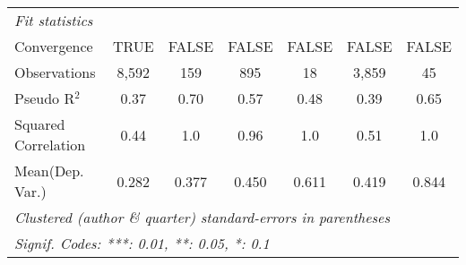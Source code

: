 \begin{tabular}{lcccccc}
   \midrule
   \emph{Fit statistics}\\
   Convergence                                                &TRUE         & FALSE        & FALSE         & FALSE & FALSE         & FALSE\\  
   Observations                                               & 8,592       & 159          & 895           & 18    & 3,859         & 45\\  
   Pseudo R$^2$                                               & 0.37        & 0.70         & 0.57          & 0.48  & 0.39          & 0.65\\  
   Squared Correlation                                        & 0.44        & 1.0          & 0.96          & 1.0   & 0.51          & 1.0\\  
Mean(Dep. Var.) & 0.282 & 0.377 & 0.450 & 0.611 & 0.419 & 0.844 \\
   \midrule \midrule
   \multicolumn{7}{l}{\emph{Clustered (author \& quarter) standard-errors in parentheses}}\\
   \multicolumn{7}{l}{\emph{Signif. Codes: ***: 0.01, **: 0.05, *: 0.1}}\\
\end{tabular}
\par\endgroup
